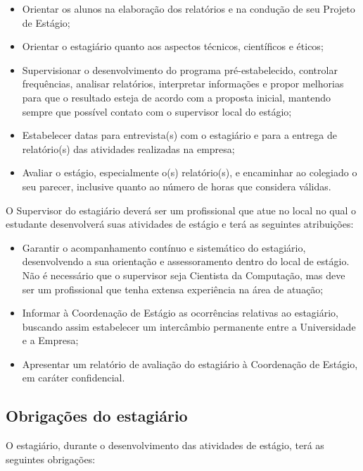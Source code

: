 \begin{itemize}
\item Orientar os alunos na elaboração dos relatórios e na condução de seu Projeto de Estágio;
\item Orientar o estagiário quanto aos aspectos técnicos, científicos e éticos;
\item Supervisionar o desenvolvimento do programa pré-estabelecido, controlar frequências, analisar relatórios, interpretar informações e propor melhorias para que o resultado esteja de acordo com a proposta inicial, mantendo sempre que possível contato com o supervisor local do estágio;
\item Estabelecer datas para entrevista(s) com o estagiário e para a entrega de relatório(s) das atividades realizadas na empresa;
\item Avaliar o estágio, especialmente o(s) relatório(s), e encaminhar ao colegiado o seu parecer, inclusive quanto ao número de horas que considera válidas.
\end{itemize}


O Supervisor do estagiário deverá ser um profissional que atue no local no qual o estudante desenvolverá suas atividades de estágio e terá as seguintes atribuições:

\begin{itemize}
\item Garantir o acompanhamento contínuo e sistemático do estagiário, desenvolvendo a sua orientação e assessoramento dentro do local de estágio. Não é necessário que o supervisor seja Cientista da Computação, mas deve ser um profissional que tenha extensa experiência na área de atuação;
\item Informar à Coordenação de Estágio as ocorrências relativas ao estagiário, buscando assim estabelecer um intercâmbio permanente entre a Universidade e a Empresa;
\item Apresentar um relatório de avaliação do estagiário à Coordenação de Estágio, em caráter confidencial.
\end{itemize}

\subsection{Obrigações do estagiário}
O estagiário, durante o desenvolvimento das atividades de estágio, terá as seguintes obrigações:

